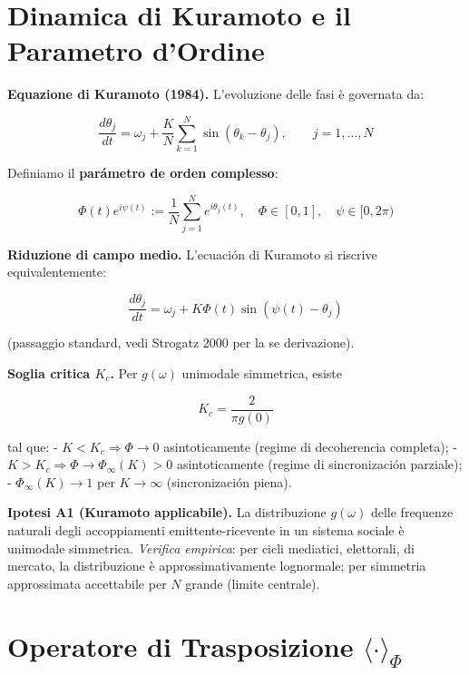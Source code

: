 \section{Dinamica di Kuramoto e il Parametro
d'Ordine}\label{dinamica-di-kuramoto-e-il-parámetro-dordine}

\Proved{} \textbf{Equazione di Kuramoto (1984).} L'evoluzione delle fasi
è governata da:

\[
\frac{d\theta_j}{dt} = \omega_j + \frac{K}{N} \sum_{k=1}^{N} \sin(\theta_k - \theta_j), \qquad j = 1, \ldots, N
\]

Definiamo il \textbf{parámetro de orden complesso}:

\[
\Phi(t) e^{i\psi(t)} := \frac{1}{N} \sum_{j=1}^{N} e^{i\theta_j(t)}, \quad \Phi \in [0, 1], \quad \psi \in [0, 2\pi)
\]

\Proved{} \textbf{Riduzione di campo medio.} L'ecuación di Kuramoto si
riscrive equivalentemente:

\[
\frac{d\theta_j}{dt} = \omega_j + K \Phi(t) \sin(\psi(t) - \theta_j)
\]

(passaggio standard, vedi Strogatz 2000 per la se derivazione).

\Proved{} \textbf{Soglia critica \(K_c\).} Per \(g(\omega)\) unimodale
simmetrica, esiste

\[
K_c = \frac{2}{\pi g(0)}
\]

tal que: - \(K < K_c \Rightarrow \Phi \to 0\) asintoticamente (regime
di decoherencia completa); -
\(K > K_c \Rightarrow \Phi \to \Phi_\infty(K) > 0\) asintoticamente
(regime di sincronización parziale); - \(\Phi_\infty(K) \to 1\) per
\(K \to \infty\) (sincronización piena).

\Hypoth{} \textbf{Ipotesi A1 (Kuramoto applicabile).} La distribuzione
\(g(\omega)\) delle frequenze naturali degli accoppiamenti
emittente-ricevente in un sistema sociale è unimodale simmetrica.
\emph{Verifica empirica}: per cicli mediatici, elettorali, di mercato,
la distribuzione è approssimativamente lognormale; per simmetria
approssimata accettabile per \(N\) grande (limite centrale).



\section{\texorpdfstring{Operatore di Trasposizione
\(\langle \cdot \rangle_\Phi\)}{Operatore di Trasposizione \textbackslash langle \textbackslash cdot \textbackslash rangle\_\textbackslash Phi}}\label{operatore-di-trasposizione-langle-cdot-rangle_phi}

